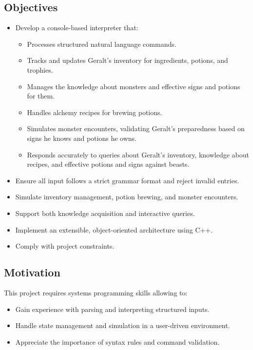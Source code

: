 \documentclass{article}
\begin{document}
\subsection{Objectives}
\begin{itemize}
  \item Develop a console-based interpreter that:
    \begin{itemize}
        \item Processes structured natural language commands.
        \item Tracks and updates Geralt’s inventory for ingredients, potions, and trophies.
        \item Manages the knowledge about monsters and effective signs and potions for them.
        \item Handles alchemy recipes for brewing potions.
        \item Simulates monster encounters, validating Geralt’s preparedness based on signs he knows and potions he owns.
        \item Responds accurately to queries about Geralt's inventory, knowledge about recipes, and effective potions and signs against beasts.
    \end{itemize}
  \item Ensure all input follows a strict grammar format and reject invalid entries.  
  \item Simulate inventory management, potion brewing, and monster encounters.
  \item Support both knowledge acquisition and interactive queries.
  \item Implement an extensible, object-oriented architecture using C++.
  \item Comply with project constraints.
\end{itemize}

\subsection{Motivation}
This project requires systems programming skills allowing to:
\begin{itemize}
    \item Gain experience with parsing and interpreting structured inputs.
    \item Handle state management and simulation in a user-driven environment.
    \item Appreciate the importance of syntax rules and command validation.
\end{itemize}
\end{document}
